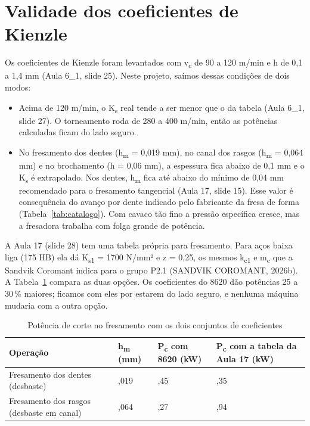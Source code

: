 \section{Validade dos coeficientes de Kienzle}

Os coeficientes de Kienzle foram levantados com v\textsubscript{c} de 90 a 120 m/min e h de 0,1 a 1,4 mm (Aula 6\_1, slide 25). Neste projeto, saímos dessas condições de dois modos:

\begin{itemize}
\item Acima de 120 m/min, o K\textsubscript{s} real tende a ser menor que o da tabela (Aula 6\_1, slide 27). O torneamento roda de 280 a 400 m/min, então as potências calculadas ficam do lado seguro.
\item No fresamento dos dentes (h\textsubscript{m} = 0,019 mm), no canal dos rasgos (h\textsubscript{m} = 0,064 mm) e no brochamento (h = 0,06 mm), a espessura fica abaixo de 0,1 mm e o K\textsubscript{s} é extrapolado. Nos dentes, h\textsubscript{m} fica até abaixo do mínimo de 0,04 mm recomendado para o fresamento tangencial (Aula 17, slide 15). Esse valor é consequência do avanço por dente indicado pelo fabricante da fresa de forma (Tabela~\ref{tab:catalogo}). Com cavaco tão fino a pressão específica cresce, mas a fresadora trabalha com folga grande de potência.
\end{itemize}

A Aula 17 (slide 28) tem uma tabela própria para fresamento. Para aços baixa liga (175 HB) ela dá K\textsubscript{s1} = 1700 N/mm² e z = 0,25, os mesmos k\textsubscript{c1} e m\textsubscript{c} que a Sandvik Coromant indica para o grupo P2.1 (SANDVIK COROMANT, 2026b). A Tabela~\ref{tab:cmpks} compara as duas opções. Os coeficientes do 8620 dão potências 25 a 30\,\% maiores; ficamos com eles por estarem do lado seguro, e nenhuma máquina mudaria com a outra opção.

\begin{table}[H]
\centering
\caption{Potência de corte no fresamento com os dois conjuntos de coeficientes}\label{tab:cmpks}
{\small\renewcommand{\arraystretch}{1.2}
\begin{tabular}{|>{\raggedright\arraybackslash}p{}|>{\centering\arraybackslash}p{}|>{\centering\arraybackslash}p{}|>{\centering\arraybackslash}p{}|}
\hline
\rowcolor{cinza} \textbf{Operação} & \textbf{h\textsubscript{m} (mm)} & \textbf{P\textsubscript{c} com 8620 (kW)} & \textbf{P\textsubscript{c} com a tabela da Aula 17 (kW)} \\ \hline
Fresamento dos dentes (desbaste) & 0,019 & 0,45 & 0,35 \\ \hline
Fresamento dos rasgos (desbaste em canal) & 0,064 & 6,27 & 4,94 \\ \hline
\end{tabular}}
\end{table}

